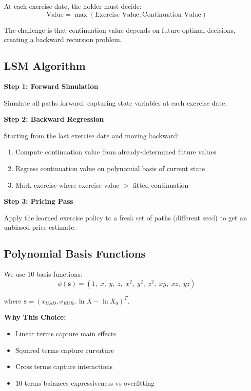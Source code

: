 \documentclass[10pt,a4paper]{article}
\begin{document}
At each exercise date, the holder must decide:
\[
\text{Value} = \max(\text{Exercise Value}, \text{Continuation Value})
\]

The challenge is that continuation value depends on future optimal decisions, creating a backward recursion problem.

\subsection{LSM Algorithm}

\textbf{Step 1: Forward Simulation}

Simulate all paths forward, capturing state variables at each exercise date.

\textbf{Step 2: Backward Regression}

Starting from the last exercise date and moving backward:
\begin{enumerate}
    \item Compute continuation value from already-determined future values
    \item Regress continuation value on polynomial basis of current state
    \item Mark exercise where exercise value $>$ fitted continuation
\end{enumerate}

\textbf{Step 3: Pricing Pass}

Apply the learned exercise policy to a fresh set of paths (different seed) to get an unbiased price estimate.

\subsection{Polynomial Basis Functions}

We use 10 basis functions:
\[
\phi(\mathbf{s}) = (1,\; x,\; y,\; z,\; x^2,\; y^2,\; z^2,\; xy,\; xz,\; yz)
\]

where $\mathbf{s} = (x_{USD}, x_{EUR}, \ln X - \ln X_0)^T$.

\textbf{Why This Choice:}
\begin{itemize}
    \item Linear terms capture main effects
    \item Squared terms capture curvature
    \item Cross terms capture interactions
    \item 10 terms balances expressiveness vs overfitting
\end{itemize}
\end{document}
